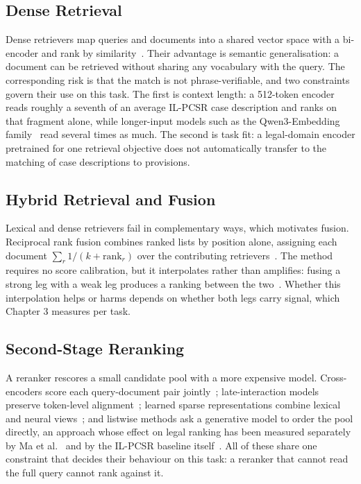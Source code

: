 \documentclass{mnnit}
\begin{document}
\subsection{Dense Retrieval}
Dense retrievers map queries and documents into a shared vector
space with a bi-encoder and rank by
similarity~\cite{dpr,sbert}. Their advantage is semantic
generalisation: a document can be retrieved without sharing any
vocabulary with the query. The corresponding risk is that the
match is not phrase-verifiable, and two constraints govern their
use on this task. The first is context length: a 512-token
encoder reads roughly a seventh of an average IL-PCSR case
description and ranks on that fragment alone, while longer-input
models such as the Qwen3-Embedding
family~\cite{qwen3emb} read several times as much. The second is
task fit: a legal-domain encoder pretrained for one retrieval
objective does not automatically transfer to the matching of case
descriptions to provisions.

\subsection{Hybrid Retrieval and Fusion}
Lexical and dense retrievers fail in complementary ways, which
motivates fusion. Reciprocal rank fusion combines ranked lists by
position alone, assigning each document
$\sum_{r} 1/(k + \mathrm{rank}_r)$ over the contributing
retrievers~\cite{rrf}. The method requires no score calibration,
but it interpolates rather than amplifies: fusing a strong leg
with a weak leg produces a ranking between the
two~\cite{bruch2023fusionhybrid}. Whether this interpolation
helps or harms depends on whether both legs carry signal, which
Chapter 3 measures per task.

\subsection{Second-Stage Reranking}
A reranker rescores a small candidate pool with a more expensive
model. Cross-encoders score each query-document pair
jointly~\cite{monobert}; late-interaction models preserve
token-level alignment~\cite{colbert}; learned sparse
representations combine lexical and neural
views~\cite{splade,bgem3}; and listwise methods ask a generative
model to order the pool directly, an approach whose effect on
legal ranking has been measured separately by Ma et
al.~\cite{ma2024llmrelevance} and by the IL-PCSR baseline
itself~\cite{ilpcsr}. All of these share one constraint that
decides their behaviour on this task: a reranker that cannot read
the full query cannot rank against it.
\end{document}
